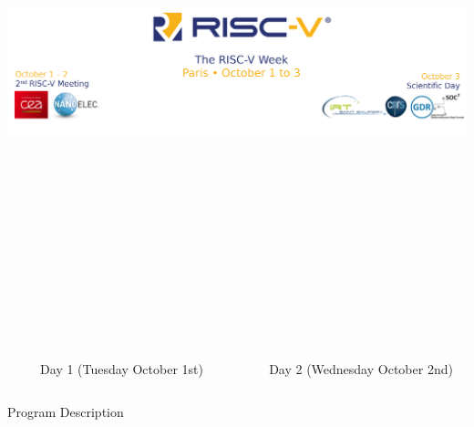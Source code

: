 \documentclass{beamer}
\newlength{\sepwidth}
\newlength{\firstcolwidth}
\newlength{\othercolwidth}
\newcommand{\sepcolumn}[0]{\begin{column}{\sepwidth}\end{column}}
\begin{document}
\begin{frame}[t]
    \begin{center}
    \includegraphics[height=15cm]{./images/banner.png}
    \end{center}

    \begin{columns}[t]
    \sepcolumn
    \begin{column}{\firstcolwidth}
        \begin{block}{\centering Day 1 (Tuesday October 1st) }
            \vspace{1cm}
            {\tiny  }
        \end{block}
    \end{column}

    \sepcolumn
    \begin{column}{\othercolwidth}
        \begin{block}{\centering Day 2 (Wednesday October 2nd) }
            \vspace{1cm}
            {\tiny  }
        \end{block}
    \end{column}
    \end{columns}

    \begin{block}{\centering Program Description}
    \begin{tiny}
    \begin{multicols}{3}
        
    \end{multicols}
    \end{tiny}

    \end{block}

\end{frame}
\end{document}
